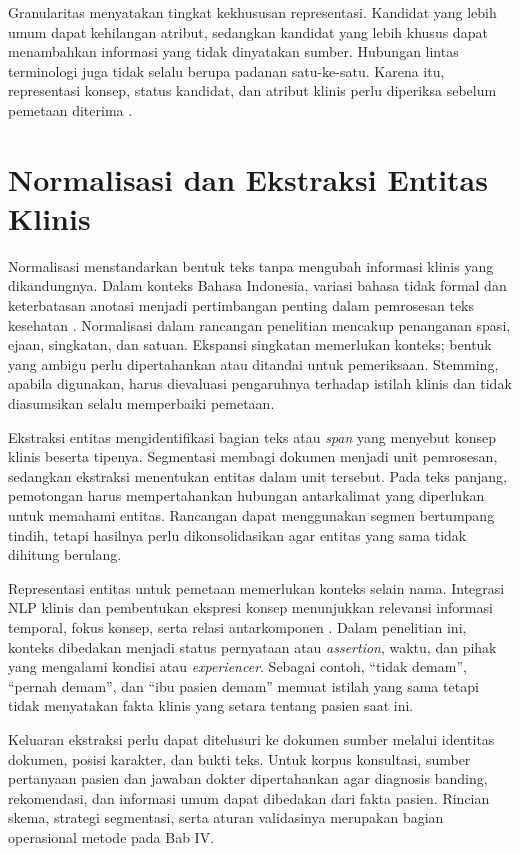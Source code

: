 Granularitas menyatakan tingkat kekhususan representasi. Kandidat yang lebih umum dapat kehilangan atribut, sedangkan kandidat yang lebih khusus dapat menambahkan informasi yang tidak dinyatakan sumber. Hubungan lintas terminologi juga tidak selalu berupa padanan satu-ke-satu. Karena itu, representasi konsep, status kandidat, dan atribut klinis perlu diperiksa sebelum pemetaan diterima \citep{kate_automatic_2020,huh_comparative_2025}.

\section{Normalisasi dan Ekstraksi Entitas Klinis}

Normalisasi menstandarkan bentuk teks tanpa mengubah informasi klinis yang dikandungnya. Dalam konteks Bahasa Indonesia, variasi bahasa tidak formal dan keterbatasan anotasi menjadi pertimbangan penting dalam pemrosesan teks kesehatan \citep{purwitasari_comparison_2023}. Normalisasi dalam rancangan penelitian mencakup penanganan spasi, ejaan, singkatan, dan satuan. Ekspansi singkatan memerlukan konteks; bentuk yang ambigu perlu dipertahankan atau ditandai untuk pemeriksaan. Stemming, apabila digunakan, harus dievaluasi pengaruhnya terhadap istilah klinis dan tidak diasumsikan selalu memperbaiki pemetaan.

Ekstraksi entitas mengidentifikasi bagian teks atau \textit{span} yang menyebut konsep klinis beserta tipenya. Segmentasi membagi dokumen menjadi unit pemrosesan, sedangkan ekstraksi menentukan entitas dalam unit tersebut. Pada teks panjang, pemotongan harus mempertahankan hubungan antarkalimat yang diperlukan untuk memahami entitas. Rancangan dapat menggunakan segmen bertumpang tindih, tetapi hasilnya perlu dikonsolidasikan agar entitas yang sama tidak dihitung berulang.

Representasi entitas untuk pemetaan memerlukan konteks selain nama. Integrasi NLP klinis dan pembentukan ekspresi konsep menunjukkan relevansi informasi temporal, fokus konsep, serta relasi antarkomponen \citep{hong_developing_2019,peterson_automating_2020}. Dalam penelitian ini, konteks dibedakan menjadi status pernyataan atau \textit{assertion}, waktu, dan pihak yang mengalami kondisi atau \textit{experiencer}. Sebagai contoh, ``tidak demam'', ``pernah demam'', dan ``ibu pasien demam'' memuat istilah yang sama tetapi tidak menyatakan fakta klinis yang setara tentang pasien saat ini.

Keluaran ekstraksi perlu dapat ditelusuri ke dokumen sumber melalui identitas dokumen, posisi karakter, dan bukti teks. Untuk korpus konsultasi, sumber pertanyaan pasien dan jawaban dokter dipertahankan agar diagnosis banding, rekomendasi, dan informasi umum dapat dibedakan dari fakta pasien. Rincian skema, strategi segmentasi, serta aturan validasinya merupakan bagian operasional metode pada Bab IV.

